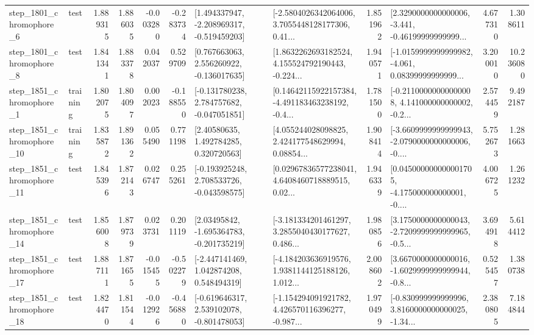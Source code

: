 \begin{tabular}{llrrrrllrlrr}
  step\_1801\_chromophore\_6 &      test &      1.889315 &    1.886035 &     -0.003280 & -0.283734 &   [1.494337947, -2.208969317, -0.519459203] &  [-2.5804026342064006, 3.7055448128177306, 0.41... &       1.851962 &  [2.3290000000000006, -3.441, -0.46199999999999... &            4.677310 &          1.308611 \\
  step\_1801\_chromophore\_8 &      test &      1.841341 &    1.883378 &      0.042037 &  0.529709 &    [0.767663063, 2.556260922, -0.136017635] &  [1.8632262693182524, 4.155524792190443, -0.224... &       1.940571 &  [-1.0159999999999982, -4.061, 0.08399999999999... &            3.200010 &         10.236080 \\
  step\_1851\_chromophore\_1 &  training &      1.802075 &    1.804097 &      0.002023 & -0.188550 &   [-0.131780238, 2.784757682, -0.047051851] &  [0.14642115922157384, -4.491183463238192, -0.4... &       1.781500 &  [-0.21100000000000008, 4.141000000000002, -0.2... &            2.574459 &          9.492187 \\
 step\_1851\_chromophore\_10 &  training &      1.835872 &    1.891362 &      0.055490 &  0.771198 &      [2.40580635, 1.492784285, 0.320720563] &  [4.055244028098825, 2.424177548629994, 0.08854... &       1.908414 &  [-3.6609999999999943, -2.0790000000000006, -0.... &            5.752673 &          1.281663 \\
 step\_1851\_chromophore\_11 &      test &      1.845396 &    1.872143 &      0.026747 &  0.255261 &   [-0.193925248, 2.708533726, -0.043598575] &  [0.02967836577238041, 4.6408460718889515, 0.02... &       1.946339 &  [0.045000000000001705, -4.175000000000001, -0.... &            4.006725 &          1.261232 \\
 step\_1851\_chromophore\_14 &      test &      1.856008 &    1.879739 &      0.023731 &  0.201119 &    [2.03495842, -1.695364783, -0.201735219] &  [-3.181334201461297, 3.2855040430177627, 0.486... &       1.980856 &  [3.1750000000000043, -2.7209999999999965, -0.5... &            3.694918 &          5.614412 \\
 step\_1851\_chromophore\_17 &      test &      1.887111 &    1.871655 &     -0.015455 & -0.502279 &    [-2.447141469, 1.042874208, 0.548494319] &  [-4.184203636919576, 1.9381144125188126, 1.012... &       2.008602 &  [3.6670000000000016, -1.6029999999999944, -0.8... &            0.525457 &          1.380738 \\
 step\_1851\_chromophore\_18 &      test &      1.824470 &    1.811544 &     -0.012926 & -0.456880 &   [-0.619646317, 2.539102078, -0.801478053] &  [-1.154294091921782, 4.426570116396277, -0.987... &       1.970499 &  [-0.830999999999996, 3.8160000000000025, -1.34... &            2.380805 &          7.184844 \\

\end{tabular}
